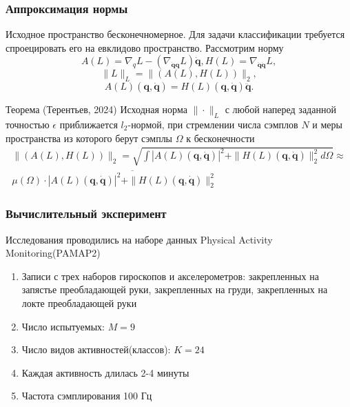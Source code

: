 \documentclass{beamer}
\begin{document}
\begin{frame}
\frametitle{Аппроксимация нормы}
Исходное пространство бесконечномерное. Для задачи классификации требуется спроецировать его на евклидово пространство. Рассмотрим норму
$$A(L) = \nabla_{q} L-\left(\nabla_{\dot{\mathbf{q}}\mathbf{q}} L\right) \dot{\mathbf{q}}, H(L) = \nabla_{\dot{\mathbf{q}} \dot{\mathbf{q}}} L,$$
$$\|L\|_L = \|(A(L), H(L))\|_2,$$
\begin{equation*}
A(L)(\mathbf{q}, \dot{\mathbf{q}}) = H(L)(\mathbf{q}, \dot{\mathbf{q}})\ddot{\mathbf{q}}.
\end{equation*}

\begin{block} {Теорема (Терентьев, 2024)}
Исходная норма $\|\cdot\|_L$ с любой наперед заданной точностью $\epsilon$ приближается $l_2$-нормой, при стремлении числа сэмплов $N$ и меры пространства из которого берут сэмплы $\Omega$ к бесконечности
\[
\begin{split}
    \|(A(L),  H(L))\|_2 = \sqrt{\int |A(L)\left(\mathbf{q}, \dot{\mathbf{q}}\right)|^2 + \|H(L)\left(\mathbf{q}, \dot{\mathbf{q}}\right)\|_2^2  d\Omega} \approx
\\
\mu(\Omega) \cdot \overline{|A(L)\left(\mathbf{q}, \dot{\mathbf{q}}\right)|^2 + \|H(L)\left(\mathbf{q}, \dot{\mathbf{q}}\right)\|_2^2}
\end{split}
\]
\end{block} 
\end{frame}



\begin{frame}
\frametitle{Вычислительный эксперимент}
Исследования проводились на наборе данных Physical Activity Monitoring(PAMAP2)
\begin{enumerate}
    \item Записи с трех наборов гироскопов и акселерометров: закрепленных на запястье преобладающей руки, закрепленных на груди, закрепленных на локте преобладающей руки
    \item Число испытуемых: $M = 9$
    \item Число видов активностей(классов): $K = 24$
    \item Каждая активность длилась 2-4 минуты
    \item Частота сэмплирования 100 Гц
\end{enumerate}

\end{frame}
\end{document}
